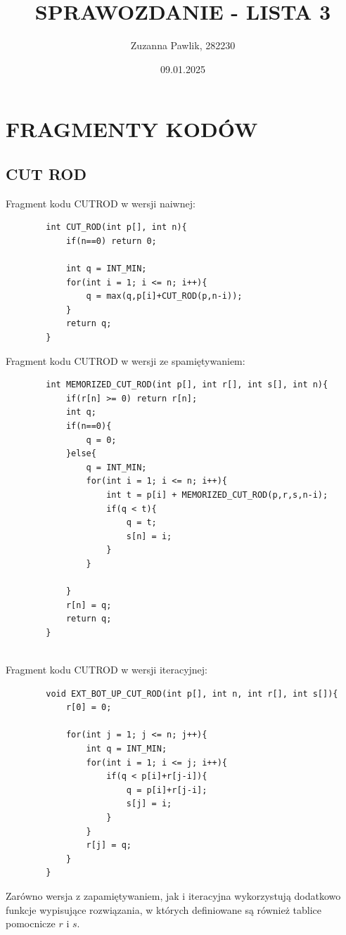 \documentclass{article}
\title{SPRAWOZDANIE - LISTA 3}
\author{Zuzanna Pawlik, 282230}
\date{09.01.2025}
\begin{document}
	\maketitle
	
	\section*{FRAGMENTY KODÓW}
	\subsection*{CUT ROD}
	Fragment kodu CUTROD w wersji naiwnej:
	\begin{verbatim}
		int CUT_ROD(int p[], int n){
			if(n==0) return 0;
			
			int q = INT_MIN;
			for(int i = 1; i <= n; i++){
				q = max(q,p[i]+CUT_ROD(p,n-i));
			}
			return q;
		}
	\end{verbatim}
	Fragment kodu CUTROD w wersji ze spamiętywaniem: 
	\begin{verbatim}
		int MEMORIZED_CUT_ROD(int p[], int r[], int s[], int n){
			if(r[n] >= 0) return r[n];
			int q;
			if(n==0){
				q = 0;
			}else{
				q = INT_MIN;
				for(int i = 1; i <= n; i++){
					int t = p[i] + MEMORIZED_CUT_ROD(p,r,s,n-i);
					if(q < t){
						q = t;
						s[n] = i;
					}
				}
				
			}
			r[n] = q;
			return q;
		}
		
	\end{verbatim}
	Fragment kodu CUTROD w wersji iteracyjnej:	
	\begin{verbatim}
		void EXT_BOT_UP_CUT_ROD(int p[], int n, int r[], int s[]){
			r[0] = 0;
			
			for(int j = 1; j <= n; j++){
				int q = INT_MIN;
				for(int i = 1; i <= j; i++){
					if(q < p[i]+r[j-i]){
						q = p[i]+r[j-i];
						s[j] = i;
					}
				}
				r[j] = q;
			}
		}
	\end{verbatim}
	Zarówno wersja z zapamiętywaniem, jak i iteracyjna wykorzystują dodatkowo funkcje wypisujące rozwiązania, w których definiowane są również tablice pomocnicze $r$ i $s$.
\end{document}
